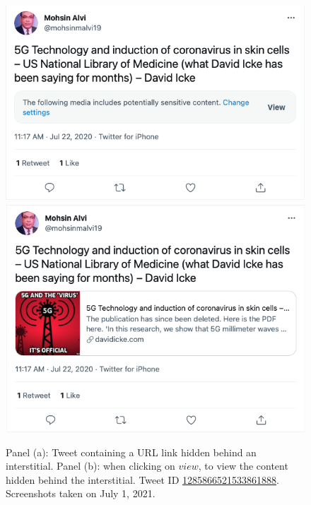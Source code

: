 \documentclass{article}
\begin{document}
\begin{figure}
	\centering
		\includegraphics[scale=0.35]{./img/tweets/Capture_2021-07-01_2.png} 
		\includegraphics[scale=0.35]{./img/tweets/Capture_2021-07-01.png}
	\caption{Panel (a): Tweet containing a URL link hidden behind an interstitial. Panel (b): when clicking on $view$, to view the content hidden behind the interstitial. Tweet ID \href{https://twitter.com/mohsinmalvi19/status/1285866521533861888}{1285866521533861888}. Screenshots taken on July 1, 2021. }
	\label{fig_notice}
\end{figure}
\end{document}
